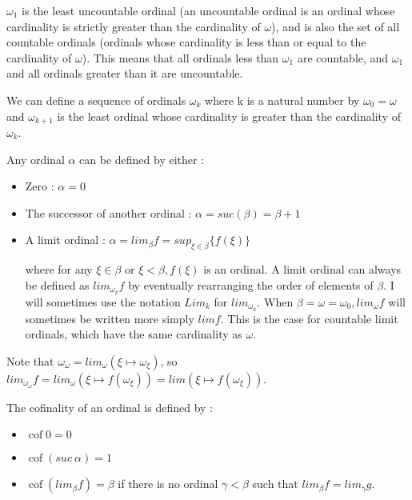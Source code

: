 \documentclass[10pt]{article}
\begin{document}
\( \omega_1 \) is the least uncountable ordinal (an uncountable ordinal is an ordinal whose cardinality is strictly greater than the cardinality of \( \omega \)), and is also the set of all countable ordinals (ordinals whose cardinality is less than or equal to the cardinality of \( \omega \)). This means that all ordinals less than \( \omega_1 \) are countable, and \( \omega_1 \) and all ordinals greater than it are uncountable.

We can define a sequence of ordinals \( \omega_k \) where k is a natural number by \( \omega_0 = \omega \) and \( \omega_{k+1} \) is the least ordinal whose cardinality is greater than the cardinality of \( \omega_k \).

\bigskip

Any ordinal \( \alpha \) can be defined by either :

\begin{itemize}
     \setlength{\itemsep}{1pt}
     \setlength{\parskip}{0pt}
     \setlength{\parsep}{0pt}

\item Zero : \( \alpha = 0 \)

\item The successor of another ordinal : \( \alpha = suc(\beta) = \beta+1 \) 

\item A limit ordinal : \( \alpha = lim_\beta f = sup_{\xi \in \beta} \lbrace f(\xi) \rbrace \)

where for any \( \xi \in \beta \) or \( \xi < \beta, f(\xi) \) is an ordinal. A limit ordinal can always be defined as \( lim_{\omega_k} f \) by eventually rearranging the order of elements of \( \beta \). I will sometimes use the notation \( Lim_k \) for \( lim_{\omega_k} \). When \( \beta = \omega = \omega_0, lim_\omega f \) will sometimes be written more simply \( lim f \). This is the case for countable limit ordinals, which have the same cardinality as \( \omega \).

\end{itemize}

Note that \( \omega_\omega = lim_\omega (\xi \mapsto \omega_\xi) \), so \( lim_{\omega_\omega} f = lim_\omega (\xi \mapsto f (\omega_\xi)) = lim (\xi \mapsto f(\omega_\xi)) \).

\bigskip

The cofinality of an ordinal is defined by : 

\begin{itemize}
     \setlength{\itemsep}{1pt}
     \setlength{\parskip}{0pt}
     \setlength{\parsep}{0pt}

\item \( \operatorname{cof} 0 = 0 \)

\item \( \operatorname{cof} (suc\ \alpha) = 1 \)

\item \( \operatorname{cof} (lim_\beta f) = \beta \) if there is no ordinal \( \gamma < \beta \) such that \( lim_\beta f = lim_\gamma g \).

\end{itemize}
\end{document}
